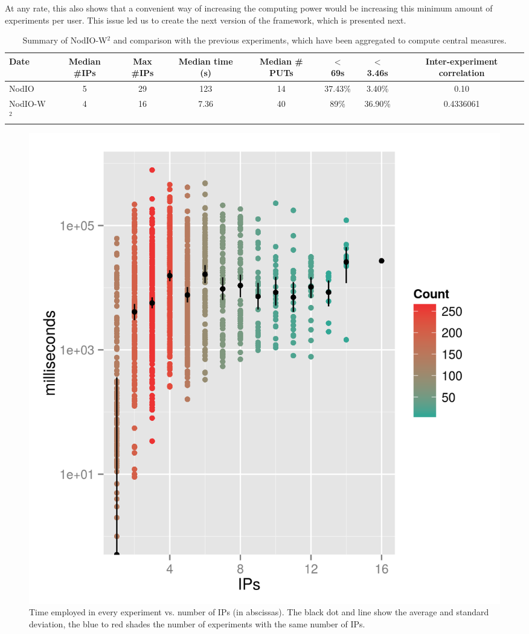 \documentclass{sig-alternate}
\begin{document}
At any rate, this also shows that a convenient way of increasing the
computing power would be increasing this minimum amount of experiments per user. This
issue led us to create the next version of the framework, which is
presented next. %

\begin{table}[!htb]
\caption{Summary of {\sf NodIO-W$^2$} and comparison with the previous
  experiments, which have been aggregated to compute central measures. \label{tab:summary:ww}}
\begin{center}
\begin{tabular}{l|ccccccc}
\hline
Date & Median \#IPs & Max \#IPs & Median time (s) & Median \# PUTs & $<$ 69s & $<$ 3.46s & Inter-experiment correlation\\
\hline
{\sf NodIO} & 5 & 29 & 123 & 14 & 37.43\% & 3.40\% & 0.10 \\
{\sf NodIO-W$^2$} & 4  & 16 & 7.36 & 40 & 89\% & 36.90\% & 0.4336061 \\
\hline
\end{tabular}
\end{center}
\end{table}
%
\begin{figure}[!htb]
\centering
\includegraphics[width=0.9\linewidth]{ips-time-ww.png}
\caption{Time employed in every experiment vs. number of IPs (in
  abscissas). The black dot and line show the average and standard
  deviation, the blue to red shades the number of experiments with the same
  number of IPs. } 
\label{fig:ipstime:w2}
\end{figure}
\end{document}
